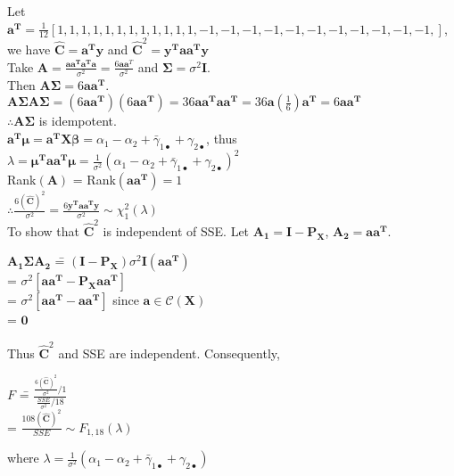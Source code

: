 \documentclass[soln,12pt]{utarexam}
\begin{document}
\begin{enumerate}
\begin{enumerate}[(a)]
\begin{answer}
           Let $\mathbf{a^T} = \frac{1}{12} [1,1,1,1,1,1,1,1,1,1,1,1,-1,-1,-1,-1,-1,-1,-1,-1,-1,-1,-1,]$, \\
we have 
           $\widehat{\mathbf{C}} = \mathbf{a^Ty}$ and 
           $\widehat{\mathbf{C}}^2 = \mathbf{y^T aa^Ty}$\\
           Take $\mathbf{A} = \frac{\mathbf{aa^Ta^Ta}}{\sigma^2} 
           = \frac{6\mathbf{a}\mathbf{a}^T}{\sigma^2}$ and 
           $\bm{\Sigma} = \sigma^2\mathbf{I}$. \\
           Then $\mathbf{A}\bm{\Sigma} = 6\mathbf{a}\mathbf{a^T}$.\\
           $\mathbf{A}\bm{\Sigma} \mathbf{A} \bm{\Sigma} 
           = (6\mathbf{a}\mathbf{a^T})(6\mathbf{a}\mathbf{a^T}) 
           = 36 \mathbf{a}\mathbf{a^T}\mathbf{a}\mathbf{a^T} 
           = 36 \mathbf{a} (\frac16) \mathbf{a^T} 
           = 6 \mathbf{a}\mathbf{a^T}$\\
           $\therefore \mathbf{A}\bm{\Sigma}$ is idempotent. \\
           $\mathbf{a^T}\bm{\mu} = \mathbf{a^T} \mathbf{X} \bm{\beta} 
           = \alpha_1 - \alpha_2 + \bar \gamma_{1 \bullet} + \gamma_{2 \bullet}$, thus\\
           $\lambda = \bm{\mu}^{\mathbf{T}} \mathbf{a}\mathbf{a^T} \bm{\mu} 
           = \frac{1}{\sigma^2}(\alpha_1 - \alpha_2 + \bar \gamma_{1\bullet } + \gamma_{2\bullet})^2$  \\
           Rank$(\mathbf{A})$ = Rank$(\mathbf{a}\mathbf{a^T}) = 1$\\
           $\therefore \frac{6(\widehat{\mathbf{C}})^2}{\sigma^2} 
           = \frac{6\mathbf{y^T}\mathbf{a}\mathbf{a^T}\mathbf{y}}{\sigma^2} 
           \sim \chi_1^2(\lambda)$\\
           To show that $\widehat{\mathbf{C}}^2$ is independent of SSE. 
           Let $\mathbf{A_1} = \mathbf{I-P_X}$, $\mathbf{A_2} = \mathbf{a}\mathbf{a^T}$.
           \begin{tabbing}
             $\mathbf{A_1}\bm{\Sigma} \mathbf{A_2}$ 
             \== $(\mathbf{I-P_X}) \sigma^2\mathbf{I}(\mathbf{a}\mathbf{a^T})$\\
             \>= $\sigma^2[\mathbf{a}\mathbf{a^T-P_X}\mathbf{a}\mathbf{a^T}]$\\
             \>= $\sigma^2[\mathbf{a}\mathbf{a^T}-\mathbf{a}\mathbf{a^T}]$ since $\mathbf{a} \in \mathcal{C} (\mathbf{X})$\\
\>= $\mathbf{0}$
\end{tabbing}
Thus $\widehat{\mathbf{C}}^2$ and SSE are independent. Consequently,
\begin{tabbing}
  $F$ \== $\frac{\frac{6(\widehat{\mathbf{C}})^2}{\sigma^2}/1}{\frac{SSE}{\sigma^2}/18}$\\
  \>= $\frac{108 (\widehat{\mathbf{C}})^2}{SSE} \sim F_{1,18}(\lambda)$
\end{tabbing}
where $\lambda =  \frac{1}{\sigma^2} (\alpha_1 - \alpha_2 + \bar \gamma_{1\bullet } + \gamma_{2\bullet})$     
         \end{answer}


\end{enumerate}
\end{enumerate}
\end{document}
